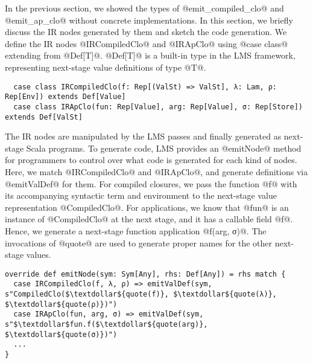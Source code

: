 In the previous section, we showed the types of @emit_compiled_clo@ and
@emit_ap_clo@ without concrete implementations. In this section, we briefly
discuss the IR nodes generated by them and sketch the code generation.
We define the IR nodes @IRCompiledClo@ and @IRApClo@ using @case class@
extending from @Def[T]@. @Def[T]@ is a built-in type in the LMS framework,
representing next-stage value definitions of type @T@.
\begin{lstlisting}
  case class IRCompiledClo(f: Rep[(ValSt) => ValSt], λ: Lam, ρ: Rep[Env]) extends Def[Value]
  case class IRApClo(fun: Rep[Value], arg: Rep[Value], σ: Rep[Store]) extends Def[ValSt]
\end{lstlisting}

The IR nodes are manipulated by the LMS passes and finally generated as
next-stage Scala programs. To generate code, LMS provides an @emitNode@ method for
programmers to control over what code is generated for each kind of nodes. Here,
we match @IRCompiledClo@ and @IRApClo@, and generate definitions via
@emitValDef@ for them.  For compiled closures, we pass the function @f@ with its
accompanying syntactic term and environment to the next-stage value
representation @CompiledClo@. For applications, we know that @fun@ is
an instance of @CompiledClo@ at the next stage, and it has a callable field
@f@. Hence, we generate a next-stage function application @f(arg, σ)@.  The
invocations of @quote@ are used to generate proper names for the other
next-stage values.
\begin{lstlisting}
override def emitNode(sym: Sym[Any], rhs: Def[Any]) = rhs match {
  case IRCompiledClo(f, λ, ρ) => emitValDef(sym, s"CompiledClo($\textdollar${quote(f)}, $\textdollar${quote(λ)}, $\textdollar${quote(ρ)})")
  case IRApClo(fun, arg, σ) => emitValDef(sym, s"$\textdollar$fun.f($\textdollar${quote(arg)}, $\textdollar${quote(σ)})")
  ...
}
\end{lstlisting}
